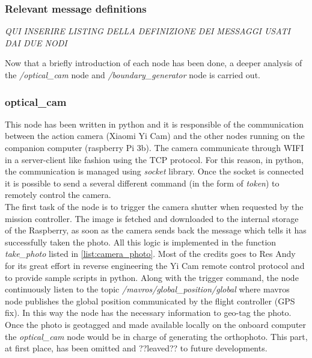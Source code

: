 \subsubsection{Relevant message definitions} %
\label{ssub:relevant_message_definitions}
\textit{QUI INSERIRE LISTING DELLA DEFINIZIONE DEI MESSAGGI USATI DAI DUE NODI}

Now that a briefly introduction of each node has been done, a deeper analysis of the \textit{/optical\_cam} node and \textit{/boundary\_generator} node is carried out.


\subsubsection{optical\_cam} %
\label{ssub:optical_cam}
This node has been written in python and it is responsible of the communication between the action camera (Xiaomi Yi Cam) and the other nodes running on the companion computer (raspberry Pi 3b). The camera communicate through WIFI in a server-client like fashion using the TCP protocol. For this reason, in python, the communication is managed using \textit{socket} library.
Once the socket is connected it is possible to send a several different command (in the form of \textit{token}) to remotely control the camera.\\
The first task of the node is to trigger the camera shutter when requested by the mission controller. The image is fetched and downloaded to the internal storage of the Raspberry, as soon as the camera sends back the message which tells it has successfully taken the photo. All this logic is implemented in the function \textit{take\_photo} listed in \autoref{list:camera_photo}. Most of the credits goes to Res Andy for its great effort in reverse engineering the Yi Cam remote control protocol and to provide sample scripts in python. \cite{YiCamGit}
Along with the trigger command, the node continuously listen to the topic \textit{/mavros/global\_position/global} where mavros node publishes the global position communicated by the flight controller (GPS fix). In this way the node has the necessary information to geo-tag the photo.
Once the photo is geotagged and made available locally on the onboard computer the \textit{optical\_cam} node would be in charge of generating the orthophoto. This part, at first place, has been omitted and ??leaved?? to future developments.



